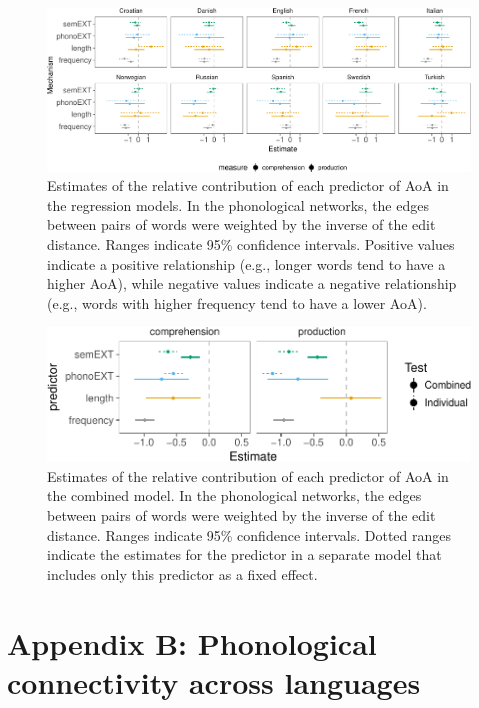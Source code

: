 \documentclass[english,floatsintext,man]{apa6}
\theoremstyle{definition}
\theoremstyle{definition}
\theoremstyle{definition}
\theoremstyle{remark}
\begin{document}
\begin{figure}[!h]
\includegraphics[width=\textwidth]{ms_files/figure-latex/staticPrednt-1} \caption{Estimates of the relative contribution of each predictor of AoA in the regression models. In the phonological networks, the edges between pairs of words were weighted by the inverse of the edit distance. Ranges indicate 95\% confidence intervals. Positive values indicate a positive relationship (e.g., longer words tend to have a higher AoA), while negative values indicate a negative relationship (e.g., words with higher frequency tend to have a lower AoA).}\label{fig:staticPrednt}
\end{figure}

\begin{figure}[!h]
\includegraphics[width=\textwidth]{ms_files/figure-latex/staticAllnt-1} \caption{Estimates of the relative contribution of each predictor of AoA in the combined model. In the phonological networks, the edges between pairs of words were weighted by the inverse of the edit distance. Ranges indicate 95\% confidence intervals. Dotted ranges indicate the estimates for the predictor in a separate model that includes only this predictor as a fixed effect.}\label{fig:staticAllnt}
\end{figure}

\clearpage

\section{Appendix B: Phonological connectivity across
languages}\label{appendix-b-phonological-connectivity-across-languages}
\end{document}
